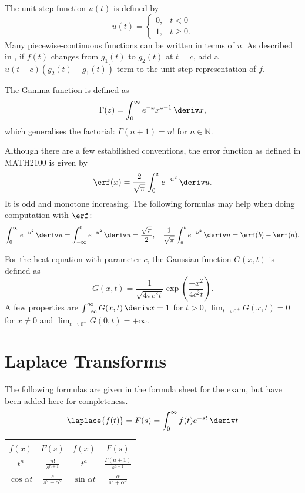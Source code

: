 \documentclass[10pt, a4paper]{article}
\begin{document}
\begin{landscape}
\begin{multicols*}{2}
    The unit step function \(u(t)\) is defined by
    \[
        u(t) = \begin{cases}
            0, & t < 0 \\
            1, & t \geq 0.
        \end{cases}  
    \]
    Many piecewise-continuous functions can be written in terms of \(u\). As described in \cite{LaplacePractice},
    if \(f(t)\) changes from \(g_1(t)\) to \(g_2(t)\) at \(t = c\), add a \(u(t-c) (g_2(t) - g_1(t))\) term
    to the unit step representation of \(f\).

    The Gamma function is defined as
    \[
        \Gamma(z) = \int_0^{\infty} e^{-x} x^{z-1} \,\deriv x,
    \]
    which generalises the factorial: \(\Gamma(n + 1) = n!\) for \(n \in \mathbb{N}\).

    Although there are a few estabilished conventions, the error function as defined in MATH2100 is given by
    \[
        \erf(x) = \frac{2}{\sqrt{\pi}} \int_0^x e^{-u^2} \,\deriv u.
    \]
    It is odd and monotone increasing. The following formulas may help when doing computation with \(\erf\):
    \[
        \int_0^{\infty} e^{-u^2} \,\deriv u = \int_{-\infty}^{0} e^{-u^2} \,\deriv u
        = \frac{\sqrt{\pi}}{2},
        \quad
        \frac{1}{\sqrt{\pi}} \int_a^b e^{-u^2} \,\deriv u
        = \erf(b) - \erf(a).
    \]

    For the heat equation with parameter \(c\), the Gaussian function \(G(x, t)\) is defined as
    \[
        G(x, t) = \frac{1}{\sqrt{4 \pi c^2 t}} \exp \left(
            \frac{-x^2}{4c^2 t}
        \right).
    \]
    A few properties are \(\int_{-\infty}^{\infty} G(x, t) \,\deriv x = 1\) for \(t > 0\),
    \(\lim_{t \to 0^+} G(x, t) = 0\) for \(x \neq 0\) and
    \(\lim_{t \to 0^+} G(0, t) = +\infty\).

    \section{Laplace Transforms}

    The following formulas are given in the formula sheet for the exam, but have been
    added here for completeness.
    \[
        \laplace\{f(t)\} = F(s) = \int_0^{\infty} f(t) e^{-st} \,\deriv t
    \]

    {
    \everymath{\displaystyle}
    \begin{center}
    \begin{tabular}{cc@{\hskip 1cm}cc}
        \toprule
        \(f(x)\) & \(F(s)\) & \(f(x)\) & \(F(s)\) \\
        \midrule
        \(t^n\) & \(\frac{n!}{s^{n+1}}\) & \(t^a\) & \(\frac{\Gamma(a+1)}{s^{a+1}}\) \\
        \(\cos \alpha t\) & \(\frac{s}{s^2 + \alpha^2}\) & \(\sin \alpha t\) & \(\frac{\alpha}{s^2 + \alpha^2}\) \\
        

\end{tabular}
\end{center}}
\end{multicols*}
\end{landscape}
\end{document}
